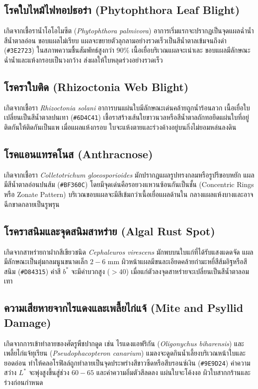 \subsection{โรคใบไหม้ไฟทอปธอร่า (Phytophthora Leaf Blight)}
เกิดจากเชื้อราน้ำโอโอไมซีต (\textit{Phytophthora palmivora}) อาการเริ่มแรกจะปรากฏเป็นจุดแผลฉ่ำน้ำสีน้ำตาลอ่อน ขอบแผลไม่เรียบ แผลจะขยายตัวลุกลามอย่างรวดเร็วเป็นสีน้ำตาลเข้มจนถึงดำ (\texttt{\#3E2723}) ในสภาพความชื้นสัมพัทธ์สูงกว่า $90\%$ เนื้อเยื่อบริเวณแผลจะเน่าเละ ขอบแผลมีลักษณะฉ่ำน้ำและแห้งกรอบเป็นวงกว้าง ส่งผลให้ใบหลุดร่วงอย่างรวดเร็ว

\subsection{โรคราใบติด (Rhizoctonia Web Blight)}
เกิดจากเชื้อรา \textit{Rhizoctonia solani} อาการบนแผ่นใบมีลักษณะเด่นคล้ายถูกน้ำร้อนลวก เนื้อเยื่อใบเปลี่ยนเป็นสีน้ำตาลปนเทา (\texttt{\#6D4C41}) เชื้อราสร้างเส้นใยขาวนวลหรือสีน้ำตาลถักทอยึดแผ่นใบที่อยู่ติดกันให้ติดกันเป็นแพ เมื่อแผลแห้งกรอบ ใบจะแห้งตายและร่วงค้างอยู่บนกิ่งไม่ยอมหล่นลงดิน

\subsection{โรคแอนแทรคโนส (Anthracnose)}
เกิดจากเชื้อรา \textit{Colletotrichum gloeosporioides} มักปรากฏแผลรูปทรงกลมหรือรูปรีขอบหยัก แผลมีสีน้ำตาลอ่อนปนส้ม (\texttt{\#BF360C}) โดยมีจุดเด่นคือรอยวงแหวนซ้อนกันเป็นชั้น (Concentric Rings หรือ Zonate Pattern) บริเวณขอบแผลจะมีสีเข้มกว่าเนื้อเยื่อแผลด้านใน กลางแผลแห้งบางและอาจฉีกขาดกลายเป็นรูพรุน

\subsection{โรคราสนิมและจุดสนิมสาหร่าย (Algal Rust Spot)}
เกิดจากสาหร่ายกาฝากสีเขียวชนิด \textit{Cephaleuros virescens} มักพบบนใบแก่ที่ได้รับแสงแดดจัด แผลมีลักษณะเป็นตุ่มกลมนูนขนาดเล็ก $2 - 6\text{ mm}$ ผิวหน้าแผลมีขนละเอียดคล้ายกำมะหยี่สีส้มอิฐหรือสีสนิม (\texttt{\#D84315}) ค่าสี $b^*$ จะมีค่าบวกสูง ($>40$) เมื่อแก่ตัวลงจุดสาหร่ายจะเปลี่ยนเป็นสีน้ำตาลอมเทา

\subsection{ความเสียหายจากไรแดงและเพลี้ยไก่แจ้ (Mite and Psyllid Damage)}
เกิดจากการเข้าทำลายของศัตรูพืชปากดูด เช่น ไรแดงแอฟริกัน (\textit{Oligonychus biharensis}) และเพลี้ยไก่แจ้ทุเรียน (\textit{Pseudophacopteron canarium}) แมลงจะดูดกินน้ำเลี้ยงบริเวณหน้าใบและยอดอ่อน ทำให้คลอโรฟิลล์ถูกทำลายเป็นจุดประพร่างสีขาวซีดหรือสีบรอนซ์เงิน (\texttt{\#9E9D24}) ค่าความสว่าง $L^*$ จะพุ่งสูงขึ้นสู่ช่วง $60 - 65$ และค่าความอิ่มตัวสีลดลง แผ่นใบจะโค้งงอ ผิวใบสากกร้านและร่วงก่อนกำหนด

